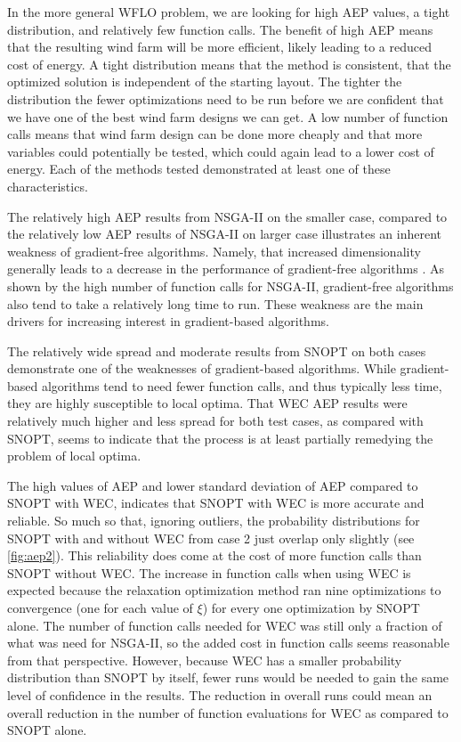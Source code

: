 \documentclass[a4paper]{jpconf}
\begin{document}
In the more general WFLO problem, we are looking for high AEP values, a tight distribution, and relatively few function calls. The benefit of high AEP means that the resulting wind farm will be more efficient, likely leading to a reduced cost of energy. A tight distribution means that the method is consistent, that the optimized solution is independent of the starting layout. The tighter the distribution the fewer optimizations need to be run before we are confident that we have one of the best wind farm designs we can get. A low number of function calls means that wind farm design can be done more cheaply and that more variables could potentially be tested, which could again lead to a lower cost of energy. Each of the methods tested demonstrated at least one of these characteristics.

The relatively high AEP results from NSGA-II on the smaller case, compared to the relatively low AEP results of NSGA-II on larger case illustrates an inherent weakness of gradient-free algorithms. Namely, that increased dimensionality generally leads to a decrease in the performance of gradient-free algorithms \cite{rios2013-grad-free-comparison}. As shown by the high number of function calls for NSGA-II, gradient-free algorithms also tend to take a relatively long time to run. These weakness are the main drivers for increasing interest in gradient-based algorithms.

The relatively wide spread and moderate results from SNOPT on both cases demonstrate one of the weaknesses of gradient-based algorithms. While gradient-based algorithms tend to need fewer function calls, and thus typically less time, they are highly susceptible to local optima. That WEC AEP results were relatively much higher and less spread for both test cases, as compared with SNOPT, seems to indicate that the process is at least partially remedying the problem of local optima.

The high values of AEP and lower standard deviation of AEP compared to SNOPT with WEC, indicates that SNOPT with WEC is more accurate and reliable. So much so that, ignoring outliers, the probability distributions for SNOPT with and without WEC from case 2 just overlap only slightly (see \cref{fig:aep2}). This reliability does come at the cost of more function calls than SNOPT without WEC. The increase in function calls when using WEC is expected because the relaxation optimization method ran nine optimizations to convergence (one for each value of $\xi$) for every one optimization by SNOPT alone. The number of function calls needed for WEC was still only a fraction of what was need for NSGA-II, so the added cost in function calls seems reasonable from that perspective. However, because WEC has a smaller probability distribution than SNOPT by itself, fewer runs would be needed to gain the same level of confidence in the results. The reduction in overall runs could mean an overall reduction in the number of function evaluations for WEC as compared to SNOPT alone.
\end{document}
